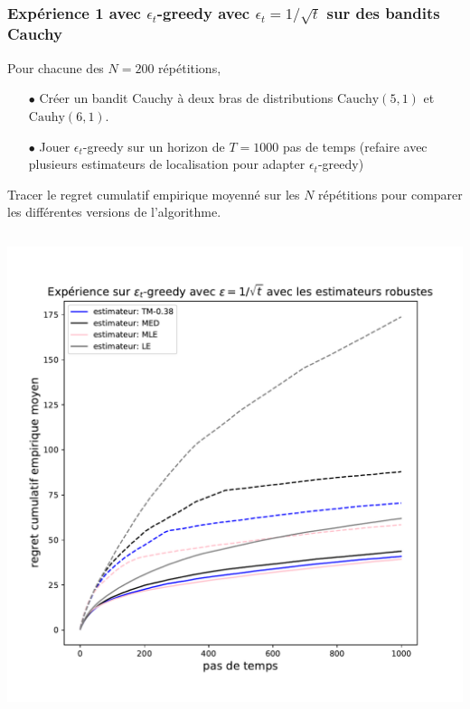 \documentclass[8pt, sans]{beamer}
\begin{document}
\begin{frame}

\frametitle{Expérience 1 avec $\epsilon_t$-greedy avec $\epsilon_t=1/\sqrt{t}$ sur des bandits Cauchy}

Pour chacune des $N=200$ répétitions,\\

\pause

\begin{itemize}

\item[$\bullet$] Créer un bandit Cauchy à deux bras de distributions $\mathrm{Cauchy}(5,1)$ et $\mathrm{Cauhy}(6,1).$

\pause
\item[$\bullet$] Jouer $\epsilon_t$-greedy sur un horizon de $T=1000$ pas de temps (refaire avec plusieurs estimateurs de localisation pour adapter $\epsilon_t$-greedy)
\end{itemize}

\pause
Tracer le regret cumulatif empirique moyenné sur les $N$ répétitions pour comparer les différentes versions de l'algorithme.

\begin{columns}[T]

\begin{column}{0.5\linewidth}

\begin{center}
\includegraphics[scale=0.3]{experience-epsilon-t-greedy.pdf}
\end{center}


\end{column}
\end{columns}
\end{frame}
\end{document}
